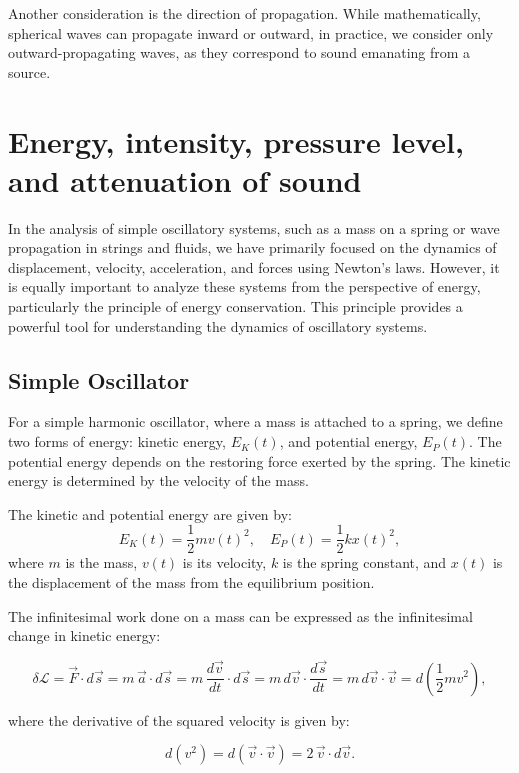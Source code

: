 \documentclass[a4paper]{article}
\begin{document}
Another consideration is the direction of propagation. While mathematically, spherical waves can propagate inward or outward, in practice, we consider only outward-propagating waves, as they correspond to sound emanating from a source.

\section {Energy, intensity, pressure level, and attenuation of sound}

In the analysis of simple oscillatory systems, such as a mass on a spring or wave propagation in strings and fluids, we have primarily focused on the dynamics of displacement, velocity, acceleration, and forces using Newton's laws. However, it is equally important to analyze these systems from the perspective of energy, particularly the principle of energy conservation. This principle provides a powerful tool for understanding the dynamics of oscillatory systems.

\subsection{Simple Oscillator}

For a simple harmonic oscillator, where a mass is attached to a spring, we define two forms of energy: kinetic energy, \(E_K(t)\), and potential energy, \(E_P(t)\). The potential energy depends on the restoring force exerted by the spring. The kinetic energy is determined by the velocity of the mass.

The kinetic and potential energy are given by:
\[
E_K(t) = \frac{1}{2} m v(t)^2, \quad E_P(t) = \frac{1}{2} k x(t)^2,
\]
where \(m\) is the mass, \(v(t)\) is its velocity, \(k\) is the spring constant, and \(x(t)\) is the displacement of the mass from the equilibrium position.



The infinitesimal work done on a mass can be expressed as the infinitesimal change in kinetic energy:

\[
\delta \mathcal{L} = \vec{F} \cdot d\vec{s} = m \, \vec{a} \cdot d\vec{s} = m \, \frac{d\vec{v}}{dt} \cdot d\vec{s} = m \, d\vec{v} \cdot \frac{d\vec{s}}{dt} = m \, d\vec{v} \cdot \vec{v} = d\left(\frac{1}{2} m v^2\right),
\]

where the derivative of the squared velocity is given by:

\[
d(v^2) = d(\vec{v} \cdot \vec{v}) = 2 \, \vec{v} \cdot d\vec{v}.
\]
\end{document}
